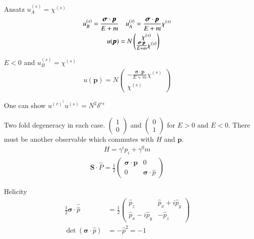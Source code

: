 Ansatz $u_A^{(s)} = \chi^{(s)}$
\begin{align}
   u_B^{(s)} = \frac{\pmb{\sigma}\cdot\pmb{p}}{E + m} &\quad u_A^{(s)} = \frac{\pmb{\sigma}\cdot\pmb{p}}{E + m} \chi^{(s)} \notag\\
   u(\pmb{p}) &= N \begin{pmatrix} \chi^{(s)} \\ \frac{\pmb{\sigma}\cdot\pmb{p}}{E + m} \chi^{(s)}\end{pmatrix}
\end{align}

$E < 0$ and $u_B^{(s)} = \chi^{(s)}$
\begin{align}
   u(\pmb{p}) = N \begin{pmatrix} -\frac{\pmb{\sigma}\cdot\pmb{p}}{E + m} \chi^{(s)} \\ \chi^{(s)}\end{pmatrix}
\end{align}

One can show $u^{(r)}^\dagger u^{(s)} = N^2 \delta^{rs}$

Two fold degeneracy in each case. $ \begin{pmatrix} 1 \\ 0\end{pmatrix}$ and $ \begin{pmatrix} 0 \\ 1\end{pmatrix} $ for $E > 0$ and $E < 0$. There must be another observable which commutes with $H$ and $\pmb{p}$.
\begin{align*}
   H = \gamma^i p_i + \gamma^0 m
\end{align*}
\begin{align}
   \pmb{S} \cdot \hat{P} = \frac{1}{2} \begin{pmatrix} \pmb{\sigma}\cdot\pmb{p} & 0 \\ 0 & \pmb{\sigma}\cdot \hat{p}\end{pmatrix}
\end{align}

Helicity
\begin{align}
   \frac{1}{2} \pmb{\sigma} \cdot \hat{\hat{p}} &= \frac{1}{2} \begin{pmatrix} \hat{p}_z & \hat{p}_x + i\hat{p}_y \\ \hat{p}_x -i \hat{p}_y & -\hat{p}_z\end{pmatrix} \\
   \det(\pmb{\sigma} \cdot \hat{p}) &= - \hat{p}^2 = - 1
\end{align}
  
